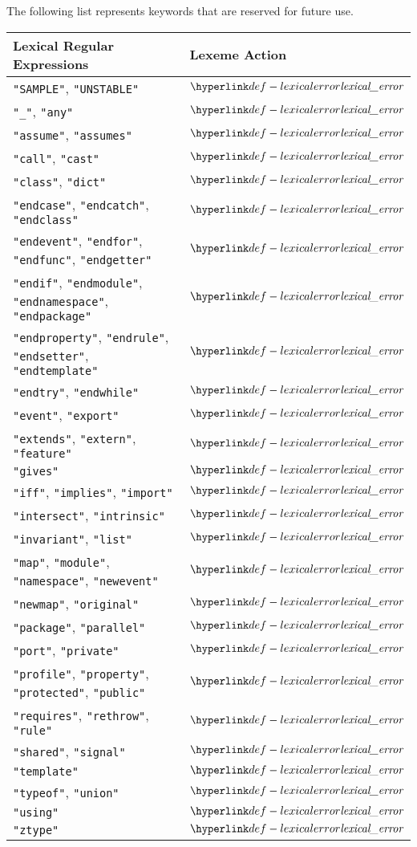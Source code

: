 The following list represents keywords that are reserved for future use.
\begin{center}
\begin{tabular}{ll}
\textbf{Lexical Regular Expressions} & \textbf{Lexeme Action}\\
\hline
\texttt{"SAMPLE"}, \texttt{"UNSTABLE"} & $\lexicalerror$ \\
\texttt{"\_"}, \texttt{"any"} & $\lexicalerror$ \\
\texttt{"assume"}, \texttt{"assumes"} & $\lexicalerror$ \\
\texttt{"call"}, \texttt{"cast"} & $\lexicalerror$ \\
\texttt{"class"}, \texttt{"dict"} & $\lexicalerror$ \\
\texttt{"endcase"}, \texttt{"endcatch"}, \texttt{"endclass"} & $\lexicalerror$ \\
\texttt{"endevent"}, \texttt{"endfor"}, \texttt{"endfunc"}, \texttt{"endgetter"} & $\lexicalerror$ \\
\texttt{"endif"}, \texttt{"endmodule"}, \texttt{"endnamespace"}, \texttt{"endpackage"} & $\lexicalerror$ \\
\texttt{"endproperty"}, \texttt{"endrule"}, \texttt{"endsetter"}, \texttt{"endtemplate"} & $\lexicalerror$ \\
\texttt{"endtry"}, \texttt{"endwhile"} & $\lexicalerror$ \\
\texttt{"event"}, \texttt{"export"} & $\lexicalerror$ \\
\texttt{"extends"}, \texttt{"extern"}, \texttt{"feature"} & $\lexicalerror$ \\
\texttt{"gives"} & $\lexicalerror$ \\
\texttt{"iff"}, \texttt{"implies"}, \texttt{"import"} & $\lexicalerror$ \\
\texttt{"intersect"}, \texttt{"intrinsic"} & $\lexicalerror$ \\
\texttt{"invariant"}, \texttt{"list"} & $\lexicalerror$ \\
\texttt{"map"}, \texttt{"module"}, \texttt{"namespace"}, \texttt{"newevent"} & $\lexicalerror$ \\
\texttt{"newmap"}, \texttt{"original"} & $\lexicalerror$ \\
\texttt{"package"}, \texttt{"parallel"} & $\lexicalerror$ \\
\texttt{"port"}, \texttt{"private"} & $\lexicalerror$ \\
\texttt{"profile"}, \texttt{"property"}, \texttt{"protected"}, \texttt{"public"} & $\lexicalerror$ \\
\texttt{"requires"}, \texttt{"rethrow"}, \texttt{"rule"} & $\lexicalerror$ \\
\texttt{"shared"}, \texttt{"signal"} & $\lexicalerror$ \\
\texttt{"template"} & $\lexicalerror$ \\
\texttt{"typeof"}, \texttt{"union"} & $\lexicalerror$ \\
\texttt{"using"} & $\lexicalerror$ \\
\texttt{"ztype"} & $\lexicalerror$ \\
\hline
\end{tabular}
\end{center}

